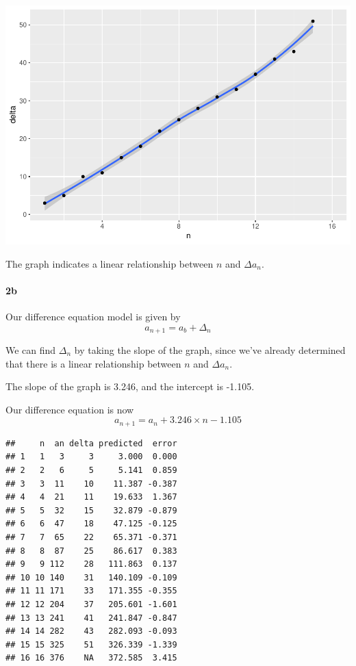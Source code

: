 \documentclass[]{article}
\let\oldparagraph\paragraph
\renewcommand{\paragraph}[1]{\oldparagraph{#1}\mbox{}}
\begin{document}
\includegraphics{DATA_609_Homework_1_files/figure-latex/2a-1.pdf}

The graph indicates a linear relationship between \(n\) and
\(\Delta a_n\).

\hypertarget{b}{%
\paragraph{2b}\label{b}}

Our difference equation model is given by \begin{equation*}
a_{n + 1} = a_b + \Delta_n
\end{equation*}

We can find \(\Delta_n\) by taking the slope of the graph, since we've
already determined that there is a linear relationship between \(n\) and
\(\Delta a_n\).

The slope of the graph is 3.246, and the intercept is -1.105.

Our difference equation is now \begin{equation*}
a_{n + 1} = a_n + 3.246\times n - 1.105
\end{equation*}

\begin{verbatim}
##     n  an delta predicted  error
## 1   1   3     3     3.000  0.000
## 2   2   6     5     5.141  0.859
## 3   3  11    10    11.387 -0.387
## 4   4  21    11    19.633  1.367
## 5   5  32    15    32.879 -0.879
## 6   6  47    18    47.125 -0.125
## 7   7  65    22    65.371 -0.371
## 8   8  87    25    86.617  0.383
## 9   9 112    28   111.863  0.137
## 10 10 140    31   140.109 -0.109
## 11 11 171    33   171.355 -0.355
## 12 12 204    37   205.601 -1.601
## 13 13 241    41   241.847 -0.847
## 14 14 282    43   282.093 -0.093
## 15 15 325    51   326.339 -1.339
## 16 16 376    NA   372.585  3.415
\end{verbatim}
\end{document}
